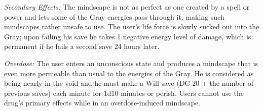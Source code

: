 \textit{Secondary Effects:} The mindscape is not as perfect as one created by a spell or power and lets some of the Gray energies pass through it, making such mindscapes rather unsafe to use. The user's life force is slowly sucked out into the Gray; upon failing his save he takes 1 negative energy level of damage, which is permanent if he fails a second save 24 hours later.

\textit{Overdose:} The user enters an unconscious state and produces a mindscape that is even more permeable than usual to the energies of the Gray. He is considered as being nearly in the void and he must make a Will save (DC 20 + the number of previous saves) each minute for 1d10 minutes or perish. Users cannot use the drug's primary effects while in an overdose-induced mindscape.
